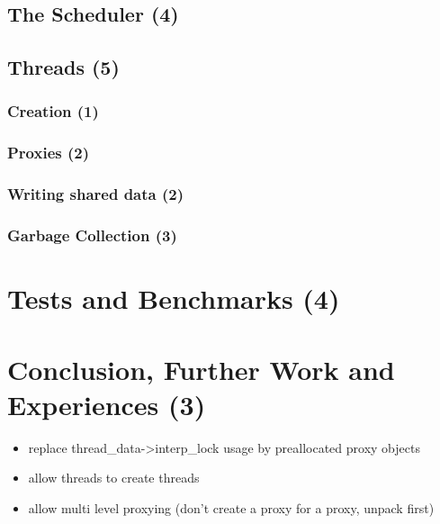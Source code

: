 \documentclass[bachelor,english]{hgbthesis}
\begin{document}
\section{The Scheduler (4)}

\section{Threads (5)}

\subsection{Creation (1)}

\subsection{Proxies (2)}

\subsection{Writing shared data (2)}

\subsection{Garbage Collection (3)}

\chapter{Tests and Benchmarks (4)}

\chapter{Conclusion, Further Work and Experiences (3)}

\begin{itemize}
\item replace thread\_data->interp\_lock usage by preallocated proxy objects
\item allow threads to create threads
\item allow multi level proxying (don't create a proxy for a proxy, unpack first)
\end{itemize}



\end{document}
